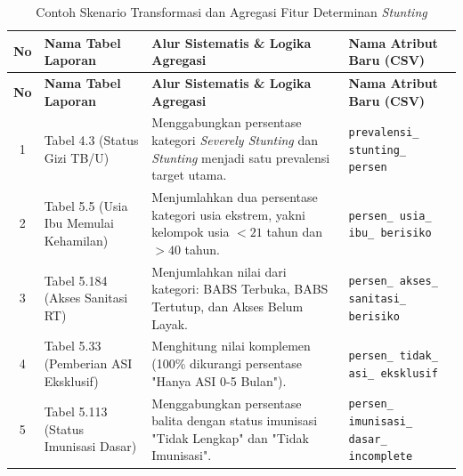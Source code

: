 \begin{longtable}{|c|p{}|p{}|p{}|}
    \caption{Contoh Skenario Transformasi dan Agregasi Fitur Determinan \textit{Stunting}}
    \label{table:4.skenario_agregasi}\\
    \hline
    \centering\textbf{No} & \centering\textbf{Nama Tabel Laporan} & \centering\textbf{Alur Sistematis \& Logika Agregasi} & \centering\textbf{Nama Atribut Baru (CSV)} \tabularnewline 
    \hline
    \endfirsthead
    \hline
    \centering\textbf{No} & \centering\textbf{Nama Tabel Laporan} & \centering\textbf{Alur Sistematis \& Logika Agregasi} & \centering\textbf{Nama Atribut Baru (CSV)} \tabularnewline 
    \hline
    \endhead
    \hline
    \endfoot
    \hline
    \endlastfoot
    
    1 & \raggedright Tabel 4.3 (Status Gizi TB/U) & \raggedright Menggabungkan persentase kategori \textit{Severely Stunting} dan \textit{Stunting} menjadi satu prevalensi target utama. & \texttt{prevalensi\_ stunting\_ persen} \tabularnewline 
    \hline
    
    2 & \raggedright Tabel 5.5 (Usia Ibu Memulai Kehamilan) & \raggedright Menjumlahkan dua persentase kategori usia ekstrem, yakni kelompok usia $<21$ tahun dan $>40$ tahun. & \texttt{persen\_ usia\_ ibu\_ berisiko} \tabularnewline
    \hline
    
    3 & \raggedright Tabel 5.184 (Akses Sanitasi RT) & \raggedright Menjumlahkan nilai dari kategori: BABS Terbuka, BABS Tertutup, dan Akses Belum Layak. & \texttt{persen\_ akses\_ sanitasi\_ berisiko} \tabularnewline
    \hline
    
    4 & \raggedright Tabel 5.33 (Pemberian ASI Eksklusif) & \raggedright Menghitung nilai komplemen (100\% dikurangi persentase "Hanya ASI 0-5 Bulan"). & \texttt{persen\_ tidak\_ asi\_ eksklusif} \tabularnewline
    \hline
    
    5 & \raggedright Tabel 5.113 (Status Imunisasi Dasar) & \raggedright Menggabungkan persentase balita dengan status imunisasi "Tidak Lengkap" dan "Tidak Imunisasi". & \texttt{persen\_ imunisasi\_ dasar\_ incomplete} \tabularnewline
    \hline
\end{longtable}


